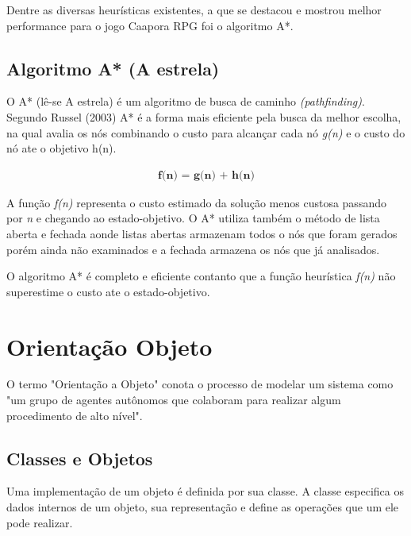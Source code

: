 Dentre as diversas heurísticas existentes, a que se destacou e mostrou melhor performance para o jogo Caapora RPG foi o algoritmo A*.
	

\subsection{Algoritmo A* (A estrela)}	
O A* (lê-se A estrela) é um algoritmo de busca de caminho \textit{(pathfinding)}. Segundo Russel (2003) A* é a forma mais eficiente pela busca da melhor escolha, na qual avalia os nós combinando o custo para alcançar cada nó \textit{g(n)} e o custo do nó ate o objetivo h(n).

\begin{align*}
    \textbf{f(n) = g(n) + h(n)}
\end{align*}


A função \textit{f(n)} representa o custo estimado da solução menos custosa passando por \textit{n} e chegando ao estado-objetivo. O A* utiliza também o método de lista aberta e fechada aonde listas abertas armazenam todos o nós que foram gerados porém ainda não examinados e a fechada armazena os nós que já analisados.

O algoritmo A* é completo e eficiente contanto que a função heurística \textit{f(n)} não superestime o custo ate o estado-objetivo.
\cite{aestar}

\section{Orientação Objeto}
\label{sec:orientação-objeto}	

O termo "Orientação a Objeto" conota o processo de modelar um sistema como "um grupo de agentes autônomos que colaboram para realizar algum procedimento de alto nível". \cite{gra}


\subsection{Classes e Objetos}	

Uma implementação de um objeto é definida por sua classe. A classe especifica os dados internos de um objeto, sua representação e define as operações que um ele pode realizar. \cite{gam}


